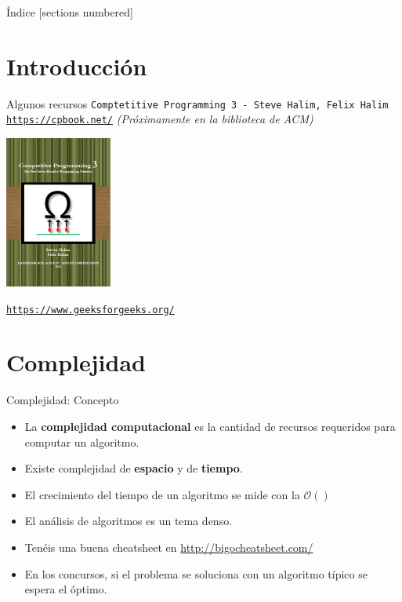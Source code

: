 \documentclass[10pt]{beamer}
\begin{document}
\begin{frame}{Índice}
  [sections numbered]
  \tableofcontents%
\end{frame}

\section{Introducción}

\begin{frame}{Algunos recursos}
  \texttt{Comptetitive Programming 3 - Steve Halim, Felix Halim}
  \href{https://cpbook.net/}{\texttt{https://cpbook.net/}}
  \emph{(Próximamente en la biblioteca de ACM)}
  \begin{center}
    \includegraphics[height=5cm]{cp3.png}
  \end{center}
  \href{https://www.geeksforgeeks.org/}{\texttt{https://www.geeksforgeeks.org/}}
\end{frame}

\section{Complejidad}
\begin{frame}{Complejidad: Concepto}
  \begin{itemize}
  \item La \textbf{complejidad computacional} es la cantidad de recursos requeridos para
    computar un algoritmo.
  \item Existe complejidad de \textbf{espacio} y de \textbf{tiempo}.
  \item El crecimiento del tiempo de un algoritmo se mide con la $\mathcal{O}()$
  \item El análisis de algoritmos es un tema denso.
  \item Tenéis una buena cheatsheet en \href{http://bigocheatsheet.com/}{http://bigocheatsheet.com/}
  \item En los concursos, si el problema se soluciona con un algoritmo típico se espera el óptimo.
  \end{itemize}
\end{frame}
\end{document}

